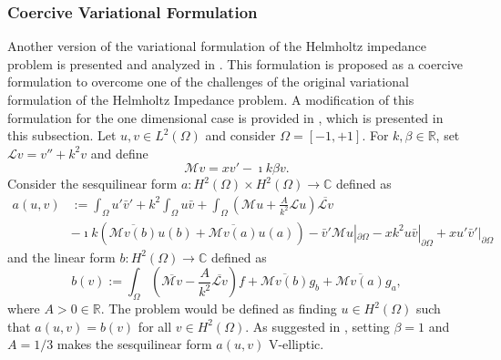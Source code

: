\subsubsection{Coercive Variational Formulation}\label{sec:coerciveformulation}
Another version of the variational formulation of the Helmholtz impedance problem is presented and analyzed in \cite{moiola2014helmholtz}. This formulation is proposed as a coercive formulation to overcome one of the challenges of the original variational formulation of the Helmholtz Impedance problem. A modification of this formulation for the one dimensional case is provided in \cite{henriquez2022}, which is presented in this subsection. Let $u, v \in L^2(\Omega)$ and consider $\Omega=[-1,+1]$. For $k, \beta \in \mathbb{R}$, set $\mathcal{L}v= v''+k^2v$ and define
\begin{equation}
    \mathcal{M}v=xv'-\imath k \beta v.
\end{equation}
Consider the sesquilinear form $a:H^2(\Omega)\times H^2(\Omega) \to \mathbb{C}$ defined as
\begin{equation}
    \label{eq:coercivelhs}
    \begin{split}
        a(u, v) & := \int_{\Omega}{u'\bar{v}'} + k^2 \int_{\Omega}{u\bar{v}} + \int_{\Omega} \left ( \mathcal{M}u + \frac{A}{k^2}\mathcal{L}u\right )\overline{\mathcal{L}v} \\ & - \imath k (\overline{\mathcal{M}v(b)}u(b) + \overline{\mathcal{M}v(a)}u(a)) - \bar{v}'\mathcal{M}u|_{\partial \Omega} - xk^2u\bar{v}|_{\partial \Omega} + xu'\bar{v}'|_{\partial \Omega}
    \end{split}
\end{equation}
and the linear form $b:H^2(\Omega) \to \mathbb{C}$ defined as
\begin{equation}
    \label{eq:coerciverhs}
    b(v) := \int_{\Omega}{\left ( \overline{\mathcal{M}v} - \frac{A}{k^2} \overline{\mathcal{L}v} \right )f + \overline{\mathcal{M}v(b)}g_b + \overline{\mathcal{M}v(a)}g_a},
\end{equation}
where $A>0 \in \mathbb{R}$. The problem would be defined as finding $u \in H^2(\Omega)$ such that $a(u,v)=b(v)$ for all $v \in H^2(\Omega)$. As suggested in \cite{henriquez2022}, setting $\beta = 1$ and $A = 1/3$ makes the sesquilinear form $a(u,v)$ V-elliptic.
